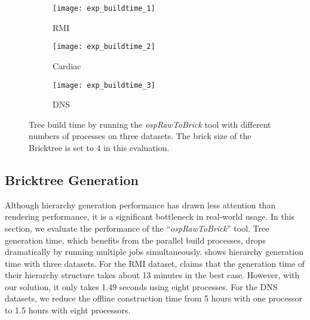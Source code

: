 \begin{figure}[h]
    \centering
    \begin{subfigure}[b]{0.32\columnwidth}
        \texttt{[image: exp\_buildtime\_1]}
        \vspace{-1.5em}
        \caption{RMI}
        \label{fig:exp_buildtime_1}
    \end{subfigure}
    \begin{subfigure}[b]{0.32\columnwidth}
        \texttt{[image: exp\_buildtime\_2]}
        \vspace{-1.5em}
        \caption{Cardiac}
        \label{fig:exp_buildtime_2}
    \end{subfigure}
    \begin{subfigure}[b]{0.32\columnwidth}
        \texttt{[image: exp\_buildtime\_3]}
        \vspace{-1.5em}
        \caption{DNS}
        \label{fig:exp_buildtime_3}
    \end{subfigure}
   
	\caption{\label{fig:exp_buildtime}%
	Tree build time by running the \textit{ospRawToBrick} tool with different numbers of processes on three datasets. The brick size of the Bricktree is set to 4 in this evaluation.}
	\vspace{-0.5em}
\end{figure}

\subsection{Bricktree Generation}

Although hierarchy generation performance has drawn less attention than rendering
performance, it is a significant bottleneck in real-world usage\cite{fogal2013analysis}. 
In this section, we evaluate the performance of the ``\textit{ospRawToBrick}'' tool. 
Tree generation time, which benefits from the parallel build processes, drops
dramatically by running multiple jobs simultaneously.  shows
 hierarchy generation time with three datasets. For the RMI dataset, \cite{fogal2013analysis} claims that the generation time of their hierarchy structure takes
about 13 minutes in the best case. However, with our solution, it only takes 1.49 seconds using
eight processes. For the DNS datasets, we reduce the offline construction time from 5 hours with 
one processor to 1.5 hours with eight processors. 


